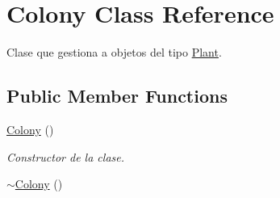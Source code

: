 \hypertarget{class_colony}{\section{Colony Class Reference}
\label{class_colony}
}


Clase que gestiona a objetos del tipo \hyperlink{class_plant}{Plant}.  


\subsection*{Public Member Functions}
\begin{DoxyCompactItemize}
\item 
\hypertarget{class_colony_aaf760edad97dee7263b86913d3bb4f98}{\hyperlink{class_colony_aaf760edad97dee7263b86913d3bb4f98}{Colony} ()}\label{class_colony_aaf760edad97dee7263b86913d3bb4f98}

\begin{DoxyCompactList}\small\item\em Constructor de la clase. \end{DoxyCompactList}\item 
\hypertarget{class_colony_a9cebe4a25260c8da7c99d10b0dab5a4e}{\hyperlink{class_colony_a9cebe4a25260c8da7c99d10b0dab5a4e}{$\sim$\+Colony} ()}\label{class_colony_a9cebe4a25260c8da7c99d10b0dab5a4e}


\end{DoxyCompactItemize}
